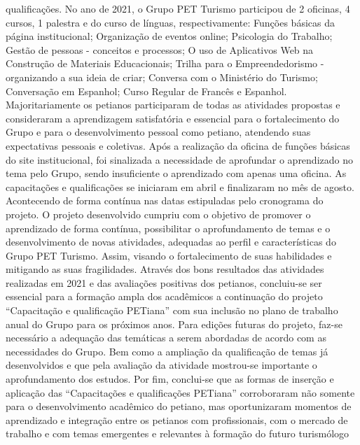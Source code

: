 qualificações. No ano de 2021, o Grupo PET Turismo participou de 2 oficinas, 4 cursos, 1 palestra 
e do curso de línguas, respectivamente: Funções básicas da página institucional; Organização de 
eventos online; Psicologia do Trabalho; Gestão de pessoas - conceitos e processos; O uso de 
Aplicativos Web na Construção de Materiais Educacionais; Trilha para o Empreendedorismo -
organizando a sua ideia de criar; Conversa com o Ministério do Turismo; Conversação em 
Espanhol; Curso Regular de Francês e Espanhol. Majoritariamente os petianos participaram de 
todas as atividades propostas e consideraram a aprendizagem satisfatória e essencial para o
fortalecimento do Grupo e para o desenvolvimento pessoal como petiano, atendendo suas 
expectativas pessoais e coletivas. Após a realização da oficina de funções básicas do site 
institucional, foi sinalizada a necessidade de aprofundar o aprendizado no tema pelo Grupo, sendo 
insuficiente o aprendizado com apenas uma oficina. As capacitações e qualificações se iniciaram 
em abril e finalizaram no mês de agosto. Acontecendo de forma contínua nas datas estipuladas
pelo cronograma do projeto. O projeto desenvolvido cumpriu com o objetivo de promover o
aprendizado de forma contínua, possibilitar o aprofundamento de temas e o desenvolvimento de 
novas atividades, adequadas ao perfil e características do Grupo PET Turismo. Assim, visando o 
fortalecimento de suas habilidades e mitigando as suas fragilidades. Através dos bons resultados 
das atividades realizadas em 2021 e das avaliações positivas dos petianos, concluiu-se ser essencial
para a formação ampla dos acadêmicos a continuação do projeto “Capacitação e qualificação 
PETiana” com sua inclusão no plano de trabalho anual do Grupo para os próximos anos. Para 
edições futuras do projeto, faz-se necessário a adequação das temáticas a serem abordadas de 
acordo com as necessidades do Grupo. Bem como a ampliação da qualificação de temas já 
desenvolvidos e que pela avaliação da atividade mostrou-se importante o aprofundamento dos 
estudos. Por fim, conclui-se que as formas de inserção e aplicação das “Capacitações e 
qualificações PETiana” corroboraram não somente para o desenvolvimento acadêmico do petiano, 
mas oportunizaram momentos de aprendizado e integração entre os petianos com profissionais, 
com o mercado de trabalho e com temas emergentes e relevantes à formação do futuro 
turismólogo




